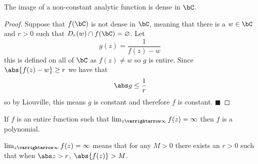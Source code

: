 \documentclass[10pt]{article}
\let\to=\varrightarrow
\def\qed{\hskip1cm\hbox{}\hfill$\blacksquare$}
\begin{document}


\bigskip

\begin{prop*}

    The image of a non-constant analytic function is dense in $\bC$.

\end{prop*}

\begin{proof}

    Suppose that $f(\bC)$ is not dense in $\bC$, meaning that there is a $w\in\bC$ and $r>0$ such that $D_r(w)\cap f(\bC)=\varnothing$.
    Let
    \[ g(z) = \frac1{f(z)-w} \]
    this is defined on all of $\bC$ as $f(z)\neq w$ so $g$ is entire.
    Since $\abs{f(z)-w}\geq r$ we have that
    \[ \abs g\leq\frac1r \]
    so by Liouville, this means $g$ is constant and therefore $f$ is constant.
    \qed

\end{proof}

\begin{thrm*}

    If $f$ is an entire function such that $\lim_{z\to\infty}f(z)=\infty$ then $f$ is a polynomial.

\end{thrm*}

$\lim_{z\to\infty}f(z)=\infty$ means that for any $M>0$ there exists an $r>0$ such that when $\abs z>r$, $\abs{f(z)}>M$.
\end{document}
